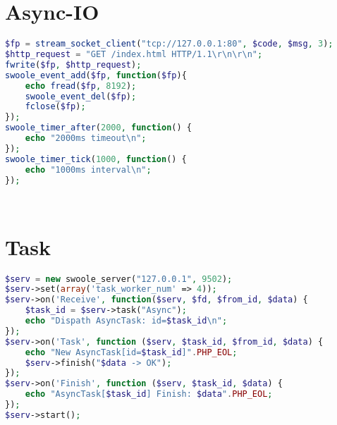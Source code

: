 \begin{lstlisting}[language=PHP]

\end{lstlisting}




\begin{lstlisting}[language=PHP]

\end{lstlisting}




\begin{lstlisting}[language=PHP]

\end{lstlisting}




\begin{lstlisting}[language=PHP]

\end{lstlisting}


\chapter{Async-IO}

\begin{lstlisting}[language=PHP]
$fp = stream_socket_client("tcp://127.0.0.1:80", $code, $msg, 3);
$http_request = "GET /index.html HTTP/1.1\r\n\r\n";
fwrite($fp, $http_request);
swoole_event_add($fp, function($fp){
    echo fread($fp, 8192);
    swoole_event_del($fp);
    fclose($fp);
});
swoole_timer_after(2000, function() {
    echo "2000ms timeout\n";
});
swoole_timer_tick(1000, function() {
    echo "1000ms interval\n";
});
\end{lstlisting}




\begin{lstlisting}[language=PHP]

\end{lstlisting}




\begin{lstlisting}[language=PHP]

\end{lstlisting}


\chapter{Task}


\begin{lstlisting}[language=PHP]
$serv = new swoole_server("127.0.0.1", 9502);
$serv->set(array('task_worker_num' => 4));
$serv->on('Receive', function($serv, $fd, $from_id, $data) {
    $task_id = $serv->task("Async");
    echo "Dispath AsyncTask: id=$task_id\n";
});
$serv->on('Task', function ($serv, $task_id, $from_id, $data) {
    echo "New AsyncTask[id=$task_id]".PHP_EOL;
    $serv->finish("$data -> OK");
});
$serv->on('Finish', function ($serv, $task_id, $data) {
    echo "AsyncTask[$task_id] Finish: $data".PHP_EOL;
});
$serv->start();
\end{lstlisting}




